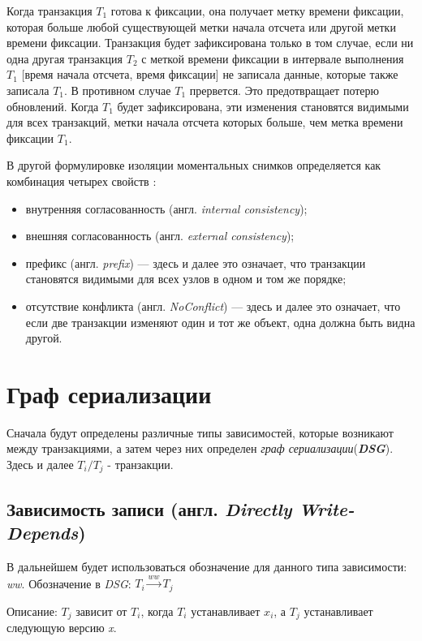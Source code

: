 \documentclass[12pt,  openany]{book}
\begin{document}
\par
Когда транзакция $T_1$ готова к фиксации, она получает метку времени фиксации, которая больше любой существующей метки начала отсчета или другой метки времени фиксации. Транзакция будет зафиксирована только в том случае, если ни одна другая транзакция $T_2$ с меткой времени фиксации в интервале выполнения $T_1$ [время начала отсчета, время фиксации] не записала данные, которые также записала $T_1$. В противном случае $T_1$ прервется. Это предотвращает потерю обновлений. Когда $T_1$ будет зафиксирована, эти изменения становятся видимыми для всех транзакций, метки начала отсчета которых больше, чем метка времени фиксации $T_1$.
\par
В другой формулировке изоляции моментальных снимков определяется как комбинация четырех свойств \cite{cerone_et_al}:
\begin{itemize}
\item внутренняя согласованность (англ. \textit{internal consistency});
\item внешняя согласованность (англ. \textit{external consistency});
\item префикс (англ. \textit{prefix}) --- здесь и далее это означает, что транзакции становятся видимыми для всех узлов в одном и том же порядке;
\item отсутствие конфликта (англ. \textit{NoConflict}) --- здесь и далее это означает, что если две транзакции изменяют один и тот же объект, одна должна быть видна другой.
\end{itemize}

\section{Граф сериализации \cite{IsolationLevelDefinitions} \cite{IsolationLevelDefinitions2}}
Сначала будут определены различные типы зависимостей, которые возникают между транзакциями, а затем через них определен \textit{граф сериализации}(\textit{\textbf{DSG}}). 
Здесь и далее $T_i/T_j$ - транзакции.
\subsection{Зависимость записи (англ. \textit{Directly Write-Depends})}
В дальнейшем будет использоваться обозначение для данного типа зависимости: \textit{ww}. Обозначение в \textit{DSG}: $T_i  \xrightarrow{\textit{ww}} T_j$
\par
Описание: $T_j$ зависит от $T_i$, когда $T_i$ устанавливает $x_i$, а $T_j$ устанавливает следующую версию \textit{x}.
\end{document}
